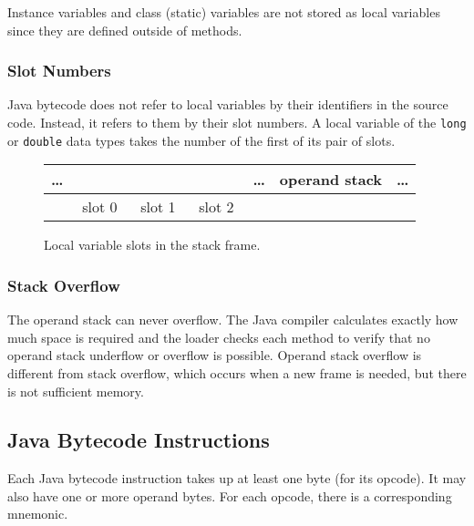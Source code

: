 Instance variables and class (static) variables are not stored as local variables since they are defined outside of methods.

\subsubsection{Slot Numbers}

Java bytecode does not refer to local variables by their identifiers in the source code.
Instead, it refers to them by their slot numbers.
A local variable of the \texttt{long} or \texttt{double} data types takes the number of the first of its pair of slots.

\begin{figure}[htp]
  \centering
  \begin{tabular}{c || c|c|c|c || c|c|c|c || c|c|c|c || c || c || c}
    \hline
    \ldots &
    \hphantom{1} & \hphantom{2} & \hphantom{3} & \hphantom{4} &
    \hphantom{1} & \hphantom{2} & \hphantom{3} & \hphantom{4} &
    \hphantom{1} & \hphantom{2} & \hphantom{3} & \hphantom{4} &
    \ldots &
    operand stack &
    \ldots \\
    \hline
    \multicolumn{1}{c||}{} &
    \multicolumn{4}{c||}{slot 0} &
    \multicolumn{4}{c||}{slot 1} &
    \multicolumn{4}{c||}{slot 2} &
    \multicolumn{1}{c}{} &
    \multicolumn{1}{c}{} &
    \multicolumn{1}{c}{} \\
  \end{tabular}
  \caption*{Local variable slots in the stack frame.}
\end{figure}

\subsubsection{Stack Overflow}

The operand stack can never overflow.
The Java compiler calculates exactly how much space is required and the loader checks each method to verify that no operand stack underflow or overflow is possible.
Operand stack overflow is different from stack overflow, which occurs when a new frame is needed, but there is not sufficient memory.

\subsection{Java Bytecode Instructions}

Each Java bytecode instruction takes up at least one byte (for its opcode).
It may also have one or more operand bytes.
For each opcode, there is a corresponding mnemonic.

